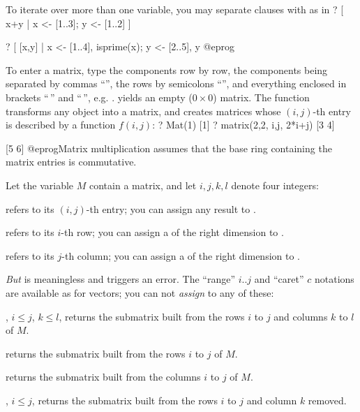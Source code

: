 To iterate over more than one variable, you may separate clauses with
 \kbd{;} as in
 \bprog
 ? [ x+y | x <- [1..3]; y <- [1..2] ]

 ? [ [x,y] | x <- [1..4], isprime(x); y <- [2..5], y %
 @eprog

%
To enter a matrix, type the components row by row, the components being
separated by commas ``\kbd{,}'', the rows by semicolons ``\kbd{;}'', and
everything enclosed in brackets ``\kbd{[}$\,$'' and ``$\,$\kbd{]}'', e.g.
\kbd{[x,y; z,t; u,v]}. \kbd{[;]} yields an empty ($0 \times 0$) matrix. The
function  transforms any object into a matrix, and 
creates matrices whose $(i,j)$-th entry is described by a function $f(i,j)$:
\bprog
? Mat(1)
[1]
? matrix(2,2, i,j, 2*i+j)
[3 4]

[5 6]
@eprog\noindent Matrix multiplication assumes that the base ring containing
the matrix entries is commutative.

\noindent Let the variable $M$ contain a matrix, and let $i,j,k,l$ denote
four
integers:

\item {} refers to its $(i,j)$-th entry; you can assign any result
to .

\item {} refers to its $i$-th row; you can assign a 
of the right dimension to .

\item {} refers to its $j$-th column; you can assign a 
of the right dimension to .

\noindent \emph{But}  is meaningless and triggers an error. The
``range'' $i..j$ and ``caret'' \kbd{\pow}$c$ notations are available as for
vectors; you can not \emph{assign} to any of these:

\item {}, $i\leq j$, $k\leq l$, returns the submatrix built
from the rows $i$ to $j$ and columns $k$ to $l$ of $M$.

\item {} returns the submatrix built from the rows $i$ to
$j$ of $M$.

\item {} returns the submatrix built from the columns $i$ to
$j$ of $M$.

\item {}, $i\leq j$, returns the submatrix built
from the rows $i$ to $j$ and column $k$ removed.

